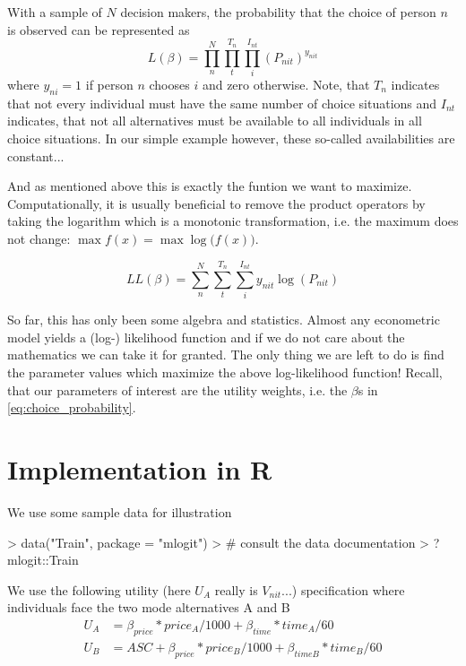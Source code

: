 \documentclass[a4paper]{article}
\begin{document}
With a sample of $N$ decision makers, the probability that the choice of person $n$ is observed can be represented as
\begin{equation}
\label{eq:likelihood}
L(\beta) = \prod_{n}^{N} \prod_{t}^{T_n} \prod_{i}^{I_{nt}} (P_{nit})^{y_{nit}}
\end{equation}
where $y_{ni}=1$ if person $n$ chooses $i$ and zero otherwise. Note, that $T_n$ indicates that not every individual must have the same number of choice situations and $I_{nt}$ indicates, that not all alternatives must be available to all individuals in all choice situations. In our simple example however, these so-called availabilities are constant...

And as mentioned above this is exactly the funtion we want to maximize. Computationally, it is usually beneficial to remove the product operators by taking the logarithm which is a monotonic transformation, i.e. the maximum does not change: $\max{f(x)} = \max{\log({f(x)}})$.

\begin{equation}
\label{eq:log_likelihood}
LL(\beta) = \sum_{n}^{N} \sum_{t}^{T_n} \sum_{i}^{I_{nt}} y_{nit} \log(P_{nit})
\end{equation}

So far, this has only been some algebra and statistics. Almost any econometric model yields a (log-) likelihood function and if we do not care about the mathematics we can take it for granted. The only thing we are left to do is find the parameter values which maximize the above log-likelihood function! Recall, that our parameters of interest are the utility weights, i.e. the $\beta$s in \eqref{eq:choice_probability}.

\section{Implementation in R}

We use some sample data for illustration

\begin{Schunk}
\begin{Sinput}
> data("Train", package = "mlogit")
> # consult the data documentation
> ?mlogit::Train
\end{Sinput}
\end{Schunk}

We use the following utility (here $U_A$ really is $V_{nit}$...) specification where individuals face the two mode alternatives A and B
\begin{align*}
\label{eq:utility}
U_A &= \beta_{price} * price_A / 1000 + \beta_{time} * time_A / 60 \\
U_B &= ASC + \beta_{price} * price_B / 1000 + \beta_{timeB} * time_B / 60
\end{align*}
\end{document}
